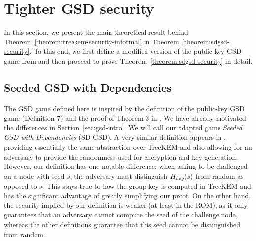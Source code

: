 \section{Tighter GSD security} \label{sec:tighter-gsd-security}

In this section, we present the main theoretical result behind Theorem~\ref{theorem:treekem-security-informal} in Theorem~\ref{theorem:sdgsd-security}. To this end, we first define a modified version of the public-key GSD game from \cite{ttkem} and then proceed to prove Theorem~\ref{theorem:sdgsd-security} in detail.

\subsection{Seeded GSD with Dependencies} \label{sec:sd-gsd-game}

The GSD game defined here is inspired by the definition of the public-key GSD game (Definition 7) and the proof of Theorem 3 in \cite{ttkem}. We have already motivated the differences in Section~\ref{sec:gsd-intro}. We will call our adapted game \emph{Seeded GSD with Dependencies} (SD-GSD). A very similar definition appears in \cite{modular-group-messaging}, providing essentially the same abstraction over TreeKEM and also allowing for an adversary to provide the randomness used for encryption and key generation. However, our definition has one notable difference: when asking to be challenged on a node with seed $s$, the adversary must distinguish $H_\mathrm{dep}(s)$ from random as opposed to $s$. This stays true to how the group key is computed in TreeKEM and has the significant advantage of greatly simplifying our proof. On the other hand, the security implied by our definition is weaker (at least in the ROM), as it only guarantees that an adversary cannot compute the seed of the challenge node, whereas the other definitions guarantee that this seed cannot be distinguished from random.

